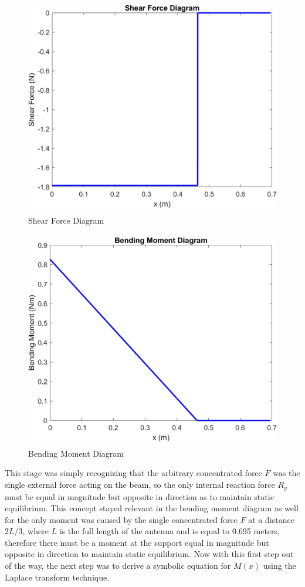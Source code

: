 \documentclass[12pt]{article}
\begin{document}
\begin{figure}[H]
\centering
\includegraphics[height= 9.5cm, width= 12.5cm]{curve_Shear_Force.png}
\caption{Shear Force Diagram}
\label{ShearForceDiagram}
\end{figure}

\begin{figure}[H]
\centering
\includegraphics[height= 9.5cm, width= 12.5cm]{curve_Bending_Moment.png}
\caption{Bending Moment Diagram}
\label{BendingMomentDiagram}
\end{figure}

\setlength{\parindent}{0cm}
This stage was simply recognizing that the arbitrary concentrated force $F$ was the single external force acting on the beam, so the only internal reaction force $R_y$ must be equal in magnitude but opposite in direction as to maintain static equilibrium. This concept stayed relevant in the bending moment diagram as well for the only moment was caused by the single concentrated force $F$ at a distance $2L/3$, where $L$ is the full length of the antenna and is equal to 0.695 meters, therefore there must be a moment at the support equal in magnitude but opposite in direction to maintain static equilibrium. Now with this first step out of the way, the next step was to derive a symbolic equation for $M(x)$ using the Laplace transform technique. 
\end{document}
